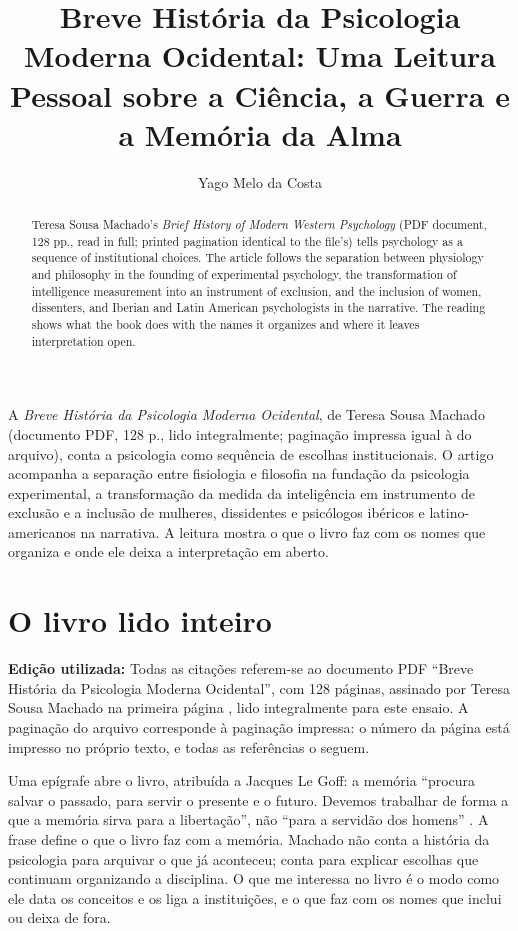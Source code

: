 \documentclass[12pt]{article}
\title{Breve História da Psicologia Moderna Ocidental: Uma Leitura Pessoal sobre a Ciência, a Guerra e a Memória da Alma}
\author{Yago Melo da Costa}
\begin{document}
\maketitle

\begin{resumo}
A \emph{Breve História da Psicologia Moderna Ocidental}, de Teresa Sousa Machado (documento PDF, 128 p., lido integralmente; paginação impressa igual à do arquivo), conta a psicologia como sequência de escolhas institucionais. O artigo acompanha a separação entre fisiologia e filosofia na fundação da psicologia experimental, a transformação da medida da inteligência em instrumento de exclusão e a inclusão de mulheres, dissidentes e psicólogos ibéricos e latino-americanos na narrativa. A leitura mostra o que o livro faz com os nomes que organiza e onde ele deixa a interpretação em aberto.
\end{resumo}

\begin{abstract}
Teresa Sousa Machado's \emph{Brief History of Modern Western Psychology} (PDF document, 128 pp., read in full; printed pagination identical to the file's) tells psychology as a sequence of institutional choices. The article follows the separation between physiology and philosophy in the founding of experimental psychology, the transformation of intelligence measurement into an instrument of exclusion, and the inclusion of women, dissenters, and Iberian and Latin American psychologists in the narrative. The reading shows what the book does with the names it organizes and where it leaves interpretation open.
\end{abstract}

\section{O livro lido inteiro}

\noindent
\textbf{Edição utilizada:} Todas as citações referem-se ao documento PDF ``Breve História da Psicologia Moderna Ocidental'', com 128 páginas, assinado por Teresa Sousa Machado na primeira página \cite{machado}, lido integralmente para este ensaio. A paginação do arquivo corresponde à paginação impressa: o número da página está impresso no próprio texto, e todas as referências o seguem.

Uma epígrafe abre o livro, atribuída a Jacques Le Goff: a memória ``procura salvar o passado, para servir o presente e o futuro. Devemos trabalhar de forma a que a memória sirva para a libertação'', não ``para a servidão dos homens'' \cite[p. 1]{machado}. A frase define o que o livro faz com a memória. Machado não conta a história da psicologia para arquivar o que já aconteceu; conta para explicar escolhas que continuam organizando a disciplina. O que me interessa no livro é o modo como ele data os conceitos e os liga a instituições, e o que faz com os nomes que inclui ou deixa de fora.
\end{document}
